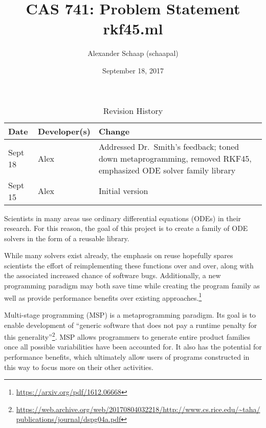 \documentclass{article}
\title{CAS 741: Problem Statement\\rkf45.ml}
\author{Alexander Schaap (schaapal)}
\date{September 18, 2017}
\begin{document}
\maketitle

\begin{table}[hp]
\caption{Revision History} \label{TblRevisionHistory}
\begin{tabularx}{\textwidth}{llX}
\toprule
\textbf{Date} & \textbf{Developer(s)} & \textbf{Change}\\
\midrule
Sept 18 & Alex & Addressed Dr.~Smith's feedback; toned down metaprogramming,
removed RKF45, emphasized ODE solver family library\\
\midrule
Sept 15 & Alex & Initial version\\
\bottomrule
\end{tabularx}
\end{table}

%
%
%

Scientists in many areas use ordinary differential equations (ODEs) in their
research. For this reason, the goal of this project is to create a family of ODE
solvers in the form of a reusable library.

While many solvers exist already, the emphasis on reuse hopefully spares
scientists the effort of reimplementing these functions over and over, along
with the associated increased chance of software bugs. Additionally, a new
programming paradigm may both save time while creating the program family as
well as provide performance benefits over existing
approaches.\footnote{\url{https://arxiv.org/pdf/1612.06668}}

Multi-stage programming (MSP) is a metaprogramming paradigm.
Its goal is to enable development of ``generic software that does not pay a
runtime penalty for this
generality''\footnote{\url{https://web.archive.org/web/20170804032218/http://www.cs.rice.edu/~taha/publications/journal/dspg04a.pdf}}.
MSP allows programmers to generate entire product families once all possible
variabilities have been accounted for. It also has the potential for
performance benefits, which ultimately allow users of programs constructed in
this way to focus more on their other activities.
\end{document}

